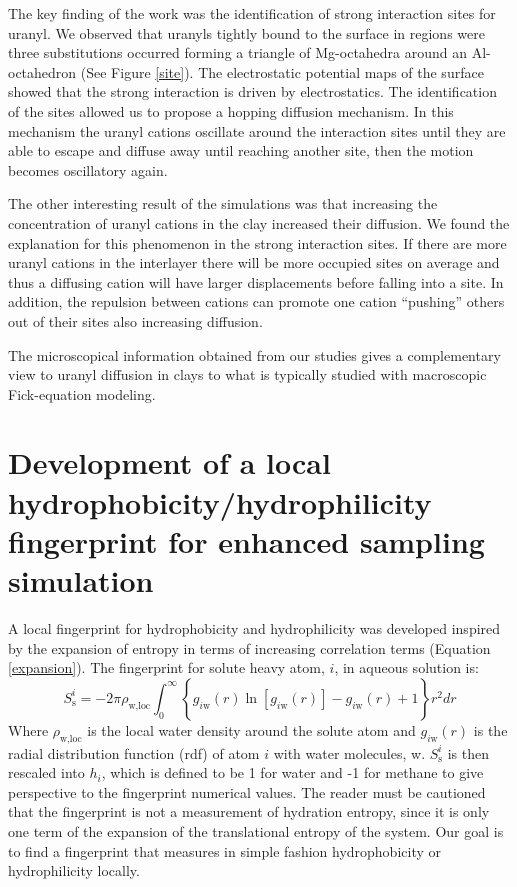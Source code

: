 The key finding of the work was the identification of strong interaction sites for uranyl. We 
observed that 
uranyls tightly bound to the surface in regions were three 
substitutions occurred forming a triangle of Mg-octahedra around an Al-octahedron (See 
Figure \ref{site}). The electrostatic potential maps of 
the surface showed that the strong interaction is driven by electrostatics. The identification 
of the sites allowed us to propose a hopping diffusion me\-cha\-nism. In this mechanism the 
uranyl 
cations oscillate around the interaction sites until they are able to escape and diffuse away 
until reaching another site, then the motion becomes oscillatory again. 

The other interesting result of the simulations was that increasing the concentration of 
uranyl cations in the clay increased their diffusion. We found the explanation for this 
phenomenon in the strong interaction sites. If there are more uranyl cations in the interlayer 
there will be more occupied sites on average and thus a diffusing cation will have larger 
displacements before falling into a site. In addition, the repulsion between cations can promote 
one cation ``pushing'' others out of their sites also increasing diffusion. 

The microscopical information obtained from our studies 
gives a complementary view to uranyl diffusion in clays to what is typically studied with 
macroscopic Fick-equation modeling.

\section[Development of a local hydrophobicity/hydrophilicity fingerprint]{Development of a 
local hydrophobicity/hydrophilicity fingerprint for enhanced 
sampling 
simulation}

A local fingerprint for hydrophobicity and hydrophilicity was developed inspired by the 
expansion 
of entropy in terms of increasing correlation terms (Equation \ref{expansion}). The fingerprint 
for solute heavy atom, $i$, in aqueous solution is:
\begin{equation}
S_{\text{s}}^{i}=-2\pi \rho_{\text{w,loc}} \int_{0}^{\infty}\left\{\right. g_{i\text{w}
}(r)\ln\left[g_{i\text{w}}(r)\right] 
-g_{i\text{w}} (r)+1\left.\right\}r^2dr
\label{sij}
\end{equation}
Where $\rho_{\text{w,loc}}$ is the local water density around the solute atom and $g_{i\text{w}
}(r)$ is the radial distribution function (\gls{rdf}) of atom $i$ with water molecules, w. 
$S_{\text{s}}^{i}$ is 
then rescaled into  $h_i$, which is defined to be 1 for water and -1 for 
methane to give perspective to the fingerprint numerical values. The reader must be cautioned that 
the fingerprint is not a measurement of hydration entropy, since it is only one term of the 
expansion of the translational entropy of the system. Our goal is to find a fingerprint that 
measures in simple fashion hydrophobicity or hydrophilicity locally. 



